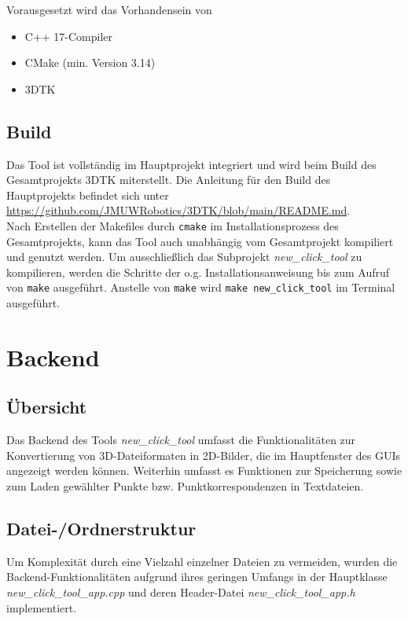 \documentclass[a4paper,10pt]{scrartcl}
\begin{document}
Vorausgesetzt wird das Vorhandensein von
\begin{itemize}
	\item C++ 17-Compiler
	\item CMake (min. Version 3.14)
	\item 3DTK
\end{itemize}

\subsection{Build}
Das Tool ist vollständig im Hauptprojekt integriert und wird beim Build des Gesamtprojekts 3DTK miterstellt. Die Anleitung für den Build des Hauptprojekts befindet sich unter \url{https://github.com/JMUWRobotics/3DTK/blob/main/README.md}.
\vspace{1em}\\
Nach Erstellen der Makefiles durch \texttt{cmake} im Installationsprozess des Gesamtprojekts, kann das Tool auch unabhängig vom Gesamtprojekt kompiliert und genutzt werden. Um ausschließlich das Subprojekt \textit{new\_click\_tool} zu kompilieren, werden die Schritte der o.g. Installationsanweisung bis zum Aufruf von \texttt{make} ausgeführt. Anstelle von \texttt{make} wird \texttt{make new\_click\_tool} im Terminal ausgeführt.

\newpage

\section{Backend}


\subsection{Übersicht}

Das Backend des Tools \textit{new\_click\_tool} umfasst die Funktionalitäten zur Konvertierung von 3D-Dateiformaten in 2D-Bilder, die im Hauptfenster des GUIs angezeigt werden können. Weiterhin umfasst es Funktionen zur Speicherung sowie zum Laden gewählter Punkte bzw. Punktkorrespondenzen in Textdateien.

\subsection{Datei-/Ordnerstruktur}
Um Komplexität durch eine Vielzahl einzelner Dateien zu vermeiden, wurden die Backend-Funktionalitäten aufgrund ihres geringen Umfangs in der Hauptklasse \textit{new\_click\_tool\_app.cpp} und deren Header-Datei \textit{new\_click\_tool\_app.h} implementiert.
\end{document}
